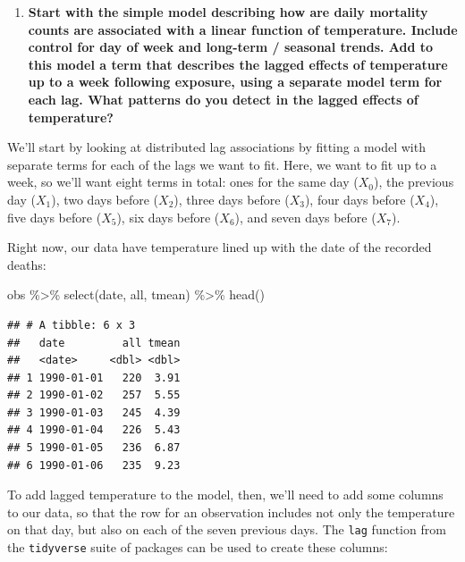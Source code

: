 \documentclass[
]{book}
\newenvironment{Shaded}{\begin{snugshade}}{\end{snugshade}}
\newcommand{\FunctionTok}[1]{\textcolor[rgb]{0.00,0.00,0.00}{#1}}
\newcommand{\NormalTok}[1]{#1}
\newcommand{\SpecialCharTok}[1]{\textcolor[rgb]{0.00,0.00,0.00}{#1}}
\providecommand{\tightlist}{%
  \setlength{\itemsep}{0pt}\setlength{\parskip}{0pt}}
\begin{document}
\begin{enumerate}
\def\labelenumi{\arabic{enumi}.}
\tightlist
\item
  \textbf{Start with the simple model describing how are daily mortality counts are
  associated with a linear function of temperature. Include control for day of
  week and long-term / seasonal trends. Add to this model a term that describes
  the lagged effects of temperature up to a week following exposure, using a
  separate model term for each lag. What patterns do you detect in the lagged
  effects of temperature?}
\end{enumerate}

We'll start by looking at distributed lag associations by fitting a model with
separate terms for each of the lags we want to fit. Here, we want to fit up to
a week, so we'll want eight terms in total: ones for the same day (\(X_0\)), the
previous day (\(X_1\)), two days before (\(X_2\)), three days before (\(X_3\)),
four days before (\(X_4\)), five days before (\(X_5\)), six days before (\(X_6\)),
and seven days before (\(X_7\)).

Right now, our data have temperature lined up with the date of the recorded deaths:

\begin{Shaded}
\begin{Highlighting}[]
\NormalTok{obs }\SpecialCharTok{\%\textgreater{}\%} 
  \FunctionTok{select}\NormalTok{(date, all, tmean) }\SpecialCharTok{\%\textgreater{}\%} 
  \FunctionTok{head}\NormalTok{()}
\end{Highlighting}
\end{Shaded}

\begin{verbatim}
## # A tibble: 6 x 3
##   date         all tmean
##   <date>     <dbl> <dbl>
## 1 1990-01-01   220  3.91
## 2 1990-01-02   257  5.55
## 3 1990-01-03   245  4.39
## 4 1990-01-04   226  5.43
## 5 1990-01-05   236  6.87
## 6 1990-01-06   235  9.23
\end{verbatim}

To add lagged temperature to the model, then, we'll need to add some columns to our
data, so that the row for an observation includes not only the temperature on that
day, but also on each of the seven previous days. The \texttt{lag} function from the \texttt{tidyverse}
suite of packages can be used to create these columns:
\end{document}
